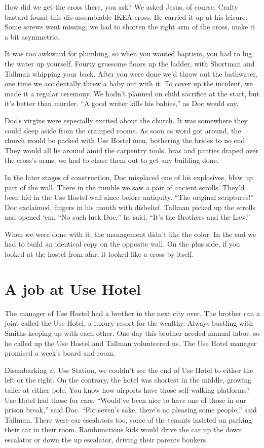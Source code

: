 \documentclass[oneside]{book}
\begin{document}
How did we get the cross there, you ask?  We asked Jesus, of course.  Crafty bastard found this dis-assemblable
IKEA cross.  He carried it up at his leisure.  Some screws went missing, we had to shorten the
right arm of the cross, make it a bit asymmetric.

It was too awkward for plumbing, so when you wanted baptism, you had to lug the water up yourself.
Fourty gruesome floors up the ladder, with Shortman and Tallman whipping your back.  After you were done we'd throw
out the bathwater, one time we accidentally threw a baby out with it.  To cover up the incident,
we made it a regular ceremony.  We hadn't planned on child sacrifice at the start, but it's better
than murder.  ``A good writer kills his babies,'' as Doc would say.

Doc's virgins were especially excited about the church.  It was somewhere they could sleep aside from
the cramped rooms.  As soon as word got around, the church would be packed with Use Hostel men,
bothering the brides to no end.  They would all lie around amid the carpentry tools, bras and panties draped
over the cross's arms, we had to chase them out to get any building done.

In the later stages of construction, Doc misplaced one of his explosives, blew up part of the wall.
There in the rumble we saw a pair of ancient scrolls.  They'd been hid in the Use Hostel wall
since before antiquity.  ``The original scriptures!'' Doc exclaimed, fingers in
his mouth with disbelief.  Tallman picked up the scrolls and opened `em.  ``No such luck Doc,'' he
said, ``It's the Brothers and the Law.''

When we were done with it, the management didn't like the color.  In the end we had to build an identical
copy on the opposite wall.  On the plus side, if you looked at the hostel from afar, it looked
like a cross by itself.

\chapter{A job at Use Hotel}

The manager of Use Hostel had a brother in the next city over.  The brother ran a joint called the Use Hotel,
a luxury resort for the wealthy.  Always bustling with Smiths keeping up with each other.
One day this brother needed manual labor, so he called up the
Use Hostel and Tallman volunteered us.  The Use Hotel manager promised a week's board and room.

Disembarking at Use Station, we couldn't see the end of Use Hotel to either the left or the right.
On the contrary, the hotel was shortest in the middle, growing taller at either pole.
You know how airports have those self-walking platforms?  Use Hotel had those for cars.
``Would've been nice to have one of those in our prison break,'' said Doc.
``For seven's sake, there's no pleasing some people,'' said Tallman.
There were car escalators too, some of the tenants insisted on parking their car
in their room.  Rambunctious kids would drive the car up the down escalator or down the
up escalator, driving their parents bonkers.
\end{document}
